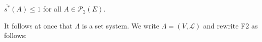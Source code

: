 $\overline{s^*}(A) \leq 1$ for all $A \in \mathcal{P}_2(E)$.

It follows at once that $\Lambda$ is a set system. We write $\Lambda = (V, \mathcal{L})$ and rewrite F2 as follows:
